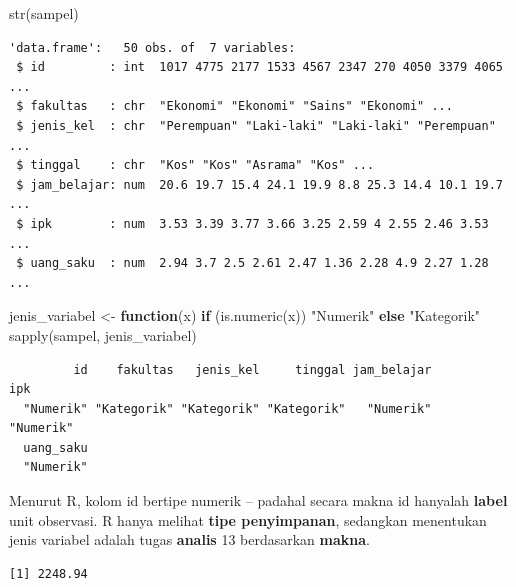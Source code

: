 \documentclass[
  indonesian,
  letterpaper,
]{book}
\newenvironment{Shaded}{\begin{snugshade}}{\end{snugshade}}
\newcommand{\CommentTok}[1]{\textcolor[rgb]{0.37,0.37,0.37}{#1}}
\newcommand{\ControlFlowTok}[1]{\textcolor[rgb]{0.00,0.23,0.31}{\textbf{#1}}}
\newcommand{\FunctionTok}[1]{\textcolor[rgb]{0.28,0.35,0.67}{#1}}
\newcommand{\NormalTok}[1]{\textcolor[rgb]{0.00,0.23,0.31}{#1}}
\newcommand{\OtherTok}[1]{\textcolor[rgb]{0.00,0.23,0.31}{#1}}
\newcommand{\SpecialCharTok}[1]{\textcolor[rgb]{0.37,0.37,0.37}{#1}}
\newcommand{\StringTok}[1]{\textcolor[rgb]{0.13,0.47,0.30}{#1}}
\begin{document}
\begin{Shaded}
\begin{Highlighting}[]
\FunctionTok{str}\NormalTok{(sampel)}
\end{Highlighting}
\end{Shaded}

\begin{verbatim}
'data.frame':   50 obs. of  7 variables:
 $ id         : int  1017 4775 2177 1533 4567 2347 270 4050 3379 4065 ...
 $ fakultas   : chr  "Ekonomi" "Ekonomi" "Sains" "Ekonomi" ...
 $ jenis_kel  : chr  "Perempuan" "Laki-laki" "Laki-laki" "Perempuan" ...
 $ tinggal    : chr  "Kos" "Kos" "Asrama" "Kos" ...
 $ jam_belajar: num  20.6 19.7 15.4 24.1 19.9 8.8 25.3 14.4 10.1 19.7 ...
 $ ipk        : num  3.53 3.39 3.77 3.66 3.25 2.59 4 2.55 2.46 3.53 ...
 $ uang_saku  : num  2.94 3.7 2.5 2.61 2.47 1.36 2.28 4.9 2.27 1.28 ...
\end{verbatim}

\begin{Shaded}
\begin{Highlighting}[]
\NormalTok{jenis\_variabel }\OtherTok{\textless{}{-}} \ControlFlowTok{function}\NormalTok{(x) }\ControlFlowTok{if}\NormalTok{ (}\FunctionTok{is.numeric}\NormalTok{(x)) }\StringTok{"Numerik"} \ControlFlowTok{else} \StringTok{"Kategorik"}
\FunctionTok{sapply}\NormalTok{(sampel, jenis\_variabel)}
\end{Highlighting}
\end{Shaded}

\begin{verbatim}
         id    fakultas   jenis_kel     tinggal jam_belajar         ipk 
  "Numerik" "Kategorik" "Kategorik" "Kategorik"   "Numerik"   "Numerik" 
  uang_saku 
  "Numerik" 
\end{verbatim}

Menurut R, kolom id bertipe numerik -- padahal secara makna id hanyalah
\textbf{label} unit observasi. R hanya melihat \textbf{tipe
penyimpanan}, sedangkan menentukan jenis variabel adalah tugas
\textbf{analis} 13 berdasarkan \textbf{makna}.

\begin{Shaded}
\end{Shaded}

\begin{verbatim}
[1] 2248.94
\end{verbatim}
\end{document}
